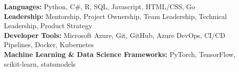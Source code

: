 \begin{itemize}[leftmargin=0.15in, label={}]
    \small{\item{
          \textbf{Languages:} {Python, C\#, R, SQL, Javascript, HTML/CSS, Go} \\
          \textbf{Leadership:} {Mentorship, Project Ownership, Team Leadership, Technical Leadership, Product Strategy} \\
          \textbf{Developer Tools:} {Microsoft Azure, Git, GitHub, Azure DevOps, CI/CD Pipelines, Docker, Kubernetes} \\
          \textbf{Machine Learning \& Data Science Frameworks:} {PyTorch, TensorFlow, scikit-learn, statsmodels}
          }}
\end{itemize}